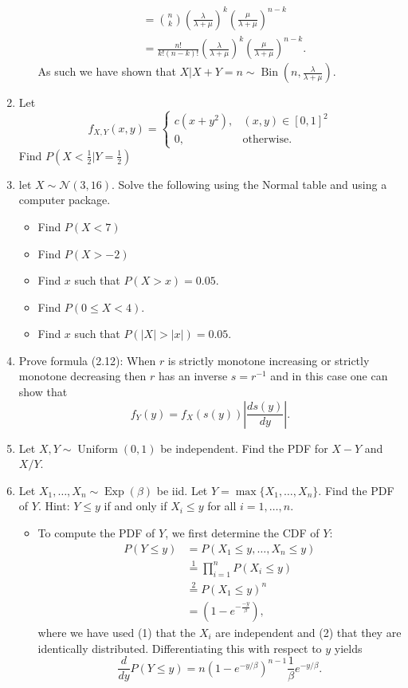 \documentclass{article}
\begin{document}
\begin{enumerate}
\begin{itemize}
$$\begin{aligned}
			&= \binom{n}{k} \left(\frac{\lambda}{\lambda + \mu}\right)^k \left( \frac{\mu}{\lambda + \mu}\right)^{n - k} \\
			&= \frac{n!}{k!(n - k)!} \left(\frac{\lambda}{\lambda + \mu}\right)^k \left( \frac{\mu}{\lambda + \mu}\right)^{n - k}.
			\end{aligned}
			$$
			As such we have shown that $X|X + Y = n \sim \operatorname{Bin}\left(n, \frac{\lambda}{\lambda + \mu}\right)$.
		\end{itemize}
	\item Let
	$$
	f_{X, Y}(x, y) = \begin{cases}
	c(x + y^2),& (x, y) \in [0, 1]^2 \\
	0,& \text{otherwise}.
	\end{cases}
	$$
	Find $P\left(X < \frac{1}{2}| Y = \frac{1}{2}\right)$
	\item let $X \sim \mathcal{N}(3, 16)$. Solve the following using the Normal table and using a computer package.
		\begin{itemize}
			\item Find $P(X < 7)$
			\item Find $P(X > -2)$
			\item Find $x$ such that $P(X > x) = 0.05$.
			\item Find $P(0 \leq X < 4)$.
			\item Find $x$ such that $P(|X| > |x|) = 0.05$.
		\end{itemize}
	\item Prove formula (2.12): When $r$ is strictly monotone increasing or strictly monotone decreasing then $r$ has an inverse $s = r^{-1}$ and in this case one can show that
	$$
	f_Y(y) = f_X(s(y)) \left|\frac{ds(y)}{dy}\right|.
	$$
	\item Let $X, Y \sim \operatorname{Uniform}(0, 1)$ be independent. Find the PDF for $X - Y$ and $X / Y$.
	\item Let $X_1, \dots, X_n \sim \operatorname{Exp}(\beta)$ be iid. Let $Y = \max\{X_1, \dots, X_n\}$. Find the PDF of $Y$. Hint: $Y \leq y$ if and only if $X_i \leq y$ for all $i = 1, \dots, n$.
		\begin{itemize}
			\item To compute the PDF of $Y$, we first determine the CDF of $Y$:
			$$
			\begin{aligned}
			P(Y \leq y) &= P(X_1 \leq y, \dots, X_n \leq y) \\
			&\overset{1}{=} \prod_{i = 1}^n P(X_i \leq y) \\
			&\overset{2}{=} P(X_1 \leq y)^n \\
			&= \left(1 - e^{- \frac{- y}{\beta}}\right),
			\end{aligned}
			$$
			where we have used (1) that the $X_i$ are independent and (2) that they are identically distributed. Differentiating this with respect to $y$ yields
			$$
			\frac{d}{dy} P(Y \leq y) = n (1 - e^{- y / \beta})^{n - 1} \frac{1}{\beta} e^{- y / \beta}.
			$$
		\end{itemize}
\end{enumerate}
\end{document}
